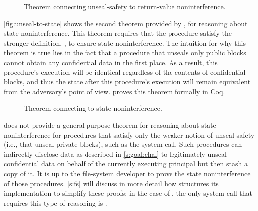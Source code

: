 \begin{figure}[ht]
  
  \caption{Theorem connecting unseal-safety to return-value noninterference.}
  \label{fig:unseal-to-ret}
\end{figure}

\autoref{fig:unseal-to-state} shows the second theorem provided by \sys,
for reasoning about state noninterference.  This theorem requires that
the procedure satisfy the stronger definition, , to
ensure state noninterference.  The intuition for why this theorem is
true lies in the fact that a procedure that unseals only public blocks
cannot obtain any confidential data in the first place.  As a result,
this procedure's execution will be identical regardless of the contents of
confidential blocks, and thus the state after this procedure's execution
will remain equivalent from the adversary's point of view.  \sys proves
this theorem formally in Coq.

\begin{figure}[ht]
  
  \caption{Theorem connecting  to state noninterference.}
  \label{fig:unseal-to-state}
\end{figure}

\sys does not provide a general-purpose theorem for reasoning about state
noninterference for procedures that satisfy only the weaker notion of
unseal-safety (i.e., that unseal private blocks), such as the 
system call.  Such procedures can indirectly disclose data as
described in \autoref{s:goal:chal} to legitimately unseal confidential
data on behalf of the currently executing principal but then stash a
copy of it.  It is up to the file-system developer to prove the state
noninterference of those procedures.  \autoref{s:fs} will discuss in
more detail how \sfscq structures its implementation to simplify these
proofs; in the case of \sfscq, the only system call that requires this
type of reasoning is .
